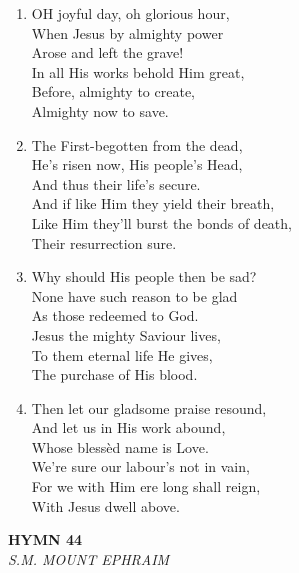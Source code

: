 \begin{enumerate}
    \item OH joyful day, oh glorious hour, \\
        When Jesus by almighty power \\
        Arose and left the grave! \\
        In all His works behold Him great, \\
        Before, almighty to create, \\
        Almighty now to save.

    \item The First-begotten from the dead, \\
        He's risen now, His people's Head, \\
        And thus their life's secure. \\
        And if like Him they yield their breath, \\
        Like Him they'll burst the bonds of death, \\
        Their resurrection sure.

    \item Why should His people then be sad? \\
        None have such reason to be glad \\
        As those redeemed to God. \\
        Jesus the mighty Saviour lives, \\
        To them eternal life He gives, \\
        The purchase of His blood.

    \item Then let our gladsome praise resound, \\
        And let us in His work abound, \\
        Whose bless\`ed name is Love. \\
        We're sure our labour's not in vain, \\
        For we with Him ere long shall reign, \\
        With Jesus dwell above.

\end{enumerate}

\newpage
\begin{center}
    {\Large \textbf{HYMN 44}}
    \\
    \textit{S.M. MOUNT EPHRAIM}
\end{center}
\vspace{1em}

